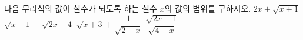 다음 무리식의 값이 실수가 되도록 하는 실수 $x$의 값의 범위를 구하시오.
 $2x+\sqrt{x+1}$
 $\sqrt{x-1}-\sqrt{2x-4}$
 $\sqrt{x+3}+\dfrac{1}{\sqrt{2-x}}$
 $\dfrac{\sqrt{2x-1}}{\sqrt{4-x}}$
